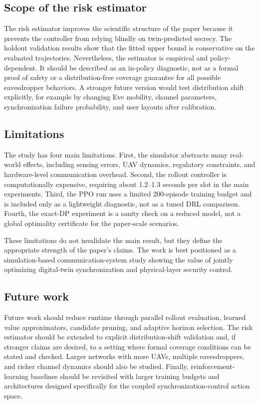 \subsection{Scope of the risk estimator}

The risk estimator improves the scientific structure of the paper because it prevents the controller from relying blindly on twin-predicted secrecy. The holdout validation results show that the fitted upper bound is conservative on the evaluated trajectories. Nevertheless, the estimator is empirical and policy-dependent. It should be described as an in-policy diagnostic, not as a formal proof of safety or a distribution-free coverage guarantee for all possible eavesdropper behaviors. A stronger future version would test distribution shift explicitly, for example by changing Eve mobility, channel parameters, synchronization failure probability, and user layouts after calibration.

\subsection{Limitations}

The study has four main limitations. First, the simulator abstracts many real-world effects, including sensing errors, UAV dynamics, regulatory constraints, and hardware-level communication overhead. Second, the rollout controller is computationally expensive, requiring about 1.2--1.3 seconds per slot in the main experiments. Third, the PPO run uses a limited 200-episode training budget and is included only as a lightweight diagnostic, not as a tuned DRL comparison. Fourth, the exact-DP experiment is a sanity check on a reduced model, not a global optimality certificate for the paper-scale scenarios.

These limitations do not invalidate the main result, but they define the appropriate strength of the paper's claims. The work is best positioned as a simulation-based communication-system study showing the value of jointly optimizing digital-twin synchronization and physical-layer security control.

\subsection{Future work}

Future work should reduce runtime through parallel rollout evaluation, learned value approximators, candidate pruning, and adaptive horizon selection. The risk estimator should be extended to explicit distribution-shift validation and, if stronger claims are desired, to a setting where formal coverage conditions can be stated and checked. Larger networks with more UAVs, multiple eavesdroppers, and richer channel dynamics should also be studied. Finally, reinforcement-learning baselines should be revisited with larger training budgets and architectures designed specifically for the coupled synchronization-control action space.

